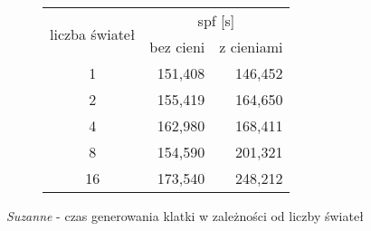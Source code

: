 \begin{figure}[H]
\begin{subfigure}{.45\textwidth}
\end{subfigure}
\hfill
\begin{subfigure}{.45\textwidth}
		\caption{Tabla z wynikami}
		\begin{longtable}{|c|r|r|} \hline
		\multirow{2}{*}{liczba świateł} & \multicolumn{2}{|c|}{spf [s]} \\ \cline{2-3}
	    & bez cieni & z cieniami \\ \hline
	    1 & 151,408 & 146,452 \\
	    2 & 155,419 & 164,650 \\
		4 & 162,980 & 168,411 \\
		8 & 154,590 & 201,321 \\
		16 & 173,540 & 248,212 \\
		\hline
		\end{longtable}
\end{subfigure}
\caption{\emph{Suzanne} - czas generowania klatki w zależności od liczby świateł}
\end{figure}

